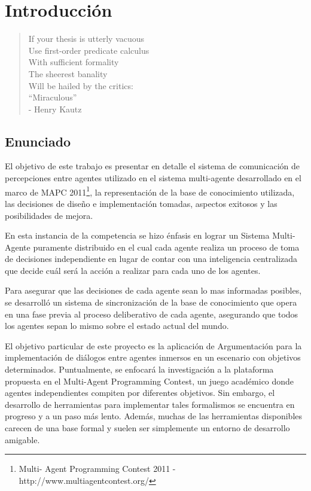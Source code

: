\chapter{Introducción}
\label{chap:introduccion}

\begin{quote}
\scriptsize{
If your thesis is utterly vacuous   \\
Use first-order predicate calculus  \\
    With sufficient formality       \\
    The sheerest banality           \\
Will be hailed by the critics:      \\
    ``Miraculous''                  \\

- Henry Kautz
}
\end{quote}

\section{Enunciado}
\label{sec:enunciado}

 El objetivo de este trabajo es presentar en detalle el sistema de
 comunicación de percepciones entre agentes utilizado en el sistema
 multi-agente desarrollado en el marco de MAPC 2011\footnote{Multi-
 Agent Programming Contest 2011 - http://www.multiagentcontest.org/},
 la representación de la base de conocimiento utilizada, las decisiones
 de diseño e implementación tomadas, aspectos exitosos y las
 posibilidades de mejora.
 
 En esta instancia de la competencia se hizo énfasis en lograr un
 Sistema Multi-Agente puramente distribuido en el cual cada agente
 realiza un proceso de toma de decisiones independiente en lugar de
 contar con una inteligencia centralizada que decide cuál será la
 acción a realizar para cada uno de los agentes. 
 
 Para asegurar que las decisiones de cada agente sean lo mas informadas
 posibles, se desarrolló un sistema de sincronización de la base de
 conocimiento que opera en una fase previa al proceso deliberativo de
 cada agente, asegurando que todos los agentes sepan lo mismo sobre el
 estado actual del mundo.
 
 El objetivo particular de este proyecto es la aplicación de
 Argumentación para la implementación de diálogos entre agentes
 inmersos en un escenario con objetivos determinados.
 Puntualmente, se enfocará la investigación a la plataforma propuesta
 en el Multi-Agent Programming Contest, un juego académico donde
 agentes independientes compiten por diferentes objetivos.
 Sin embargo, el desarrollo de herramientas para implementar tales
 formalismos se encuentra en progreso y a un paso más lento.
 Además, muchas de las herramientas disponibles carecen de una base
 formal y suelen ser simplemente un entorno de desarrollo amigable.

